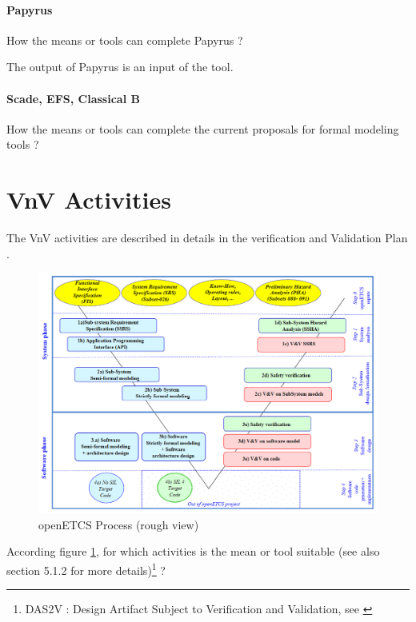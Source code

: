 \paragraph{Papyrus}
How the means or tools can complete  Papyrus ?

\begin{author_comment}
	The  output of Papyrus is an input of the tool. 
\end{author_comment}


\paragraph{Scade, EFS, Classical B}
How the means or tools can complete the current proposals for formal modeling tools ?





\section{VnV Activities}

The VnV activities are described in details in the verification and Validation Plan  \citep{D4.1}.

\begin{figure}[htb]
  \centering
  \includegraphics[width=.9\textwidth]{images/ProcessOpenETCS-BeM.png}
  \caption{openETCS Process (rough view)}
  \label{fig:openETCSProcess}
\end{figure}

According figure \ref{fig:openETCSProcess}, for which activities is the mean or tool suitable (see also \citep{D4.1} section 5.1.2 for more details)\footnote{DAS2V : Design Artifact Subject to Verification and Validation, see \citep{D4.1}} ?


